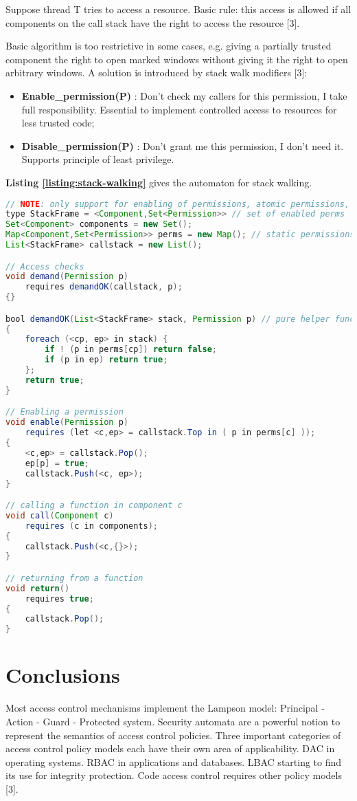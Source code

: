 Suppose thread T tries to access a resource. Basic rule: this access is allowed if all components on the call stack have the right to access the resource [3].

Basic algorithm is too restrictive in some cases, e.g. giving a partially trusted component the right to open marked windows without giving it the right to open arbitrary windows. A solution is introduced by stack walk modifiers [3]:
\begin{itemize}
	\item \textbf{Enable\_permission(P)} : Don't check my callers for this permission, I take full responsibility. Essential to implement controlled access to resources for less trusted code;
	\item \textbf{Disable\_permission(P)} : Don't grant me this permission, I don't need it. Supports principle of least privilege.
\end{itemize}


\textbf{Listing \ref{listing:stack-walking}} gives the automaton for stack walking.


\begin{lstlisting}[language=java, caption=Security automaton for stack walking., label=listing:stack-walking]
// NOTE: only support for enabling of permissions, atomic permissions, and single threading
type StackFrame = <Component,Set<Permission>> // set of enabled perms
Set<Component> components = new Set();
Map<Component,Set<Permission>> perms = new Map(); // static permissions
List<StackFrame> callstack = new List();

// Access checks
void demand(Permission p)
	requires demandOK(callstack, p);
{}

bool demandOK(List<StackFrame> stack, Permission p) // pure helper function
{
	foreach (<cp, ep> in stack) {
		if ! (p in perms[cp]) return false;
		if (p in ep) return true;
	};
	return true;
}

// Enabling a permission
void enable(Permission p)
	requires (let <c,ep> = callstack.Top in ( p in perms[c] )); 
{
	<c,ep> = callstack.Pop();
	ep[p] = true;
	callstack.Push(<c, ep>);
}

// calling a function in component c
void call(Component c)
	requires (c in components);
{
	callstack.Push(<c,{}>);
}

// returning from a function
void return() 
	requires true;
{
	callstack.Pop();
}
\end{lstlisting}


\section{Conclusions}

Most access control mechanisms implement the Lampson model: Principal - Action - Guard - Protected system. Security automata are a powerful notion to represent the semantics of access control policies. Three important categories of access control policy models each have their own area of applicability. DAC in operating systems. RBAC in applications and databases. LBAC starting to find its use for integrity protection. Code access control requires other policy models [3].


